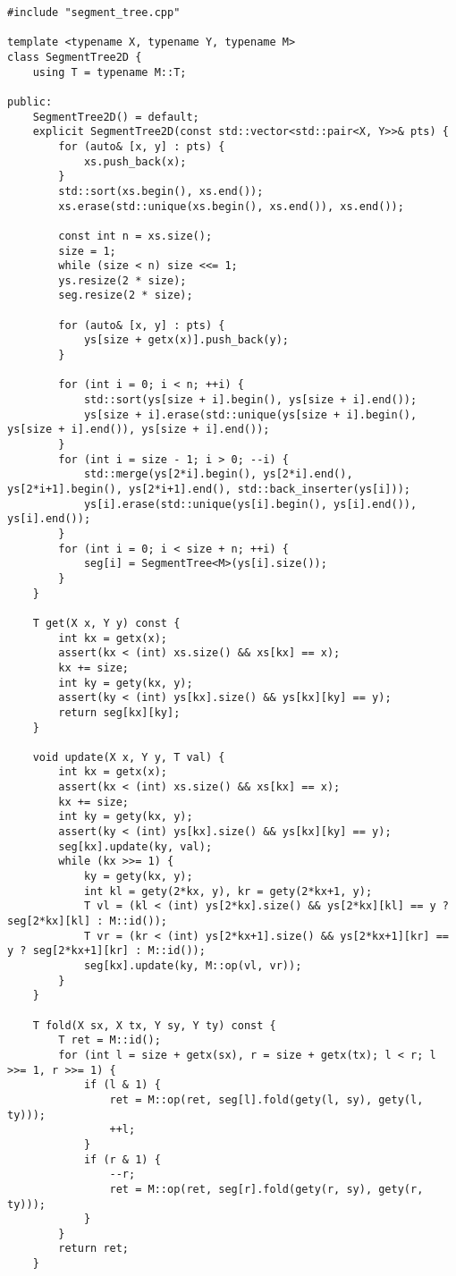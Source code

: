\begin{lstlisting}
#include "segment_tree.cpp"

template <typename X, typename Y, typename M>
class SegmentTree2D {
    using T = typename M::T;

public:
    SegmentTree2D() = default;
    explicit SegmentTree2D(const std::vector<std::pair<X, Y>>& pts) {
        for (auto& [x, y] : pts) {
            xs.push_back(x);
        }
        std::sort(xs.begin(), xs.end());
        xs.erase(std::unique(xs.begin(), xs.end()), xs.end());

        const int n = xs.size();
        size = 1;
        while (size < n) size <<= 1;
        ys.resize(2 * size);
        seg.resize(2 * size);

        for (auto& [x, y] : pts) {
            ys[size + getx(x)].push_back(y);
        }

        for (int i = 0; i < n; ++i) {
            std::sort(ys[size + i].begin(), ys[size + i].end());
            ys[size + i].erase(std::unique(ys[size + i].begin(), ys[size + i].end()), ys[size + i].end());
        }
        for (int i = size - 1; i > 0; --i) {
            std::merge(ys[2*i].begin(), ys[2*i].end(), ys[2*i+1].begin(), ys[2*i+1].end(), std::back_inserter(ys[i]));
            ys[i].erase(std::unique(ys[i].begin(), ys[i].end()), ys[i].end());
        }
        for (int i = 0; i < size + n; ++i) {
            seg[i] = SegmentTree<M>(ys[i].size());
        }
    }

    T get(X x, Y y) const {
        int kx = getx(x);
        assert(kx < (int) xs.size() && xs[kx] == x);
        kx += size;
        int ky = gety(kx, y);
        assert(ky < (int) ys[kx].size() && ys[kx][ky] == y);
        return seg[kx][ky];
    }

    void update(X x, Y y, T val) {
        int kx = getx(x);
        assert(kx < (int) xs.size() && xs[kx] == x);
        kx += size;
        int ky = gety(kx, y);
        assert(ky < (int) ys[kx].size() && ys[kx][ky] == y);
        seg[kx].update(ky, val);
        while (kx >>= 1) {
            ky = gety(kx, y);
            int kl = gety(2*kx, y), kr = gety(2*kx+1, y);
            T vl = (kl < (int) ys[2*kx].size() && ys[2*kx][kl] == y ? seg[2*kx][kl] : M::id());
            T vr = (kr < (int) ys[2*kx+1].size() && ys[2*kx+1][kr] == y ? seg[2*kx+1][kr] : M::id());
            seg[kx].update(ky, M::op(vl, vr));
        }
    }

    T fold(X sx, X tx, Y sy, Y ty) const {
        T ret = M::id();
        for (int l = size + getx(sx), r = size + getx(tx); l < r; l >>= 1, r >>= 1) {
            if (l & 1) {
                ret = M::op(ret, seg[l].fold(gety(l, sy), gety(l, ty)));
                ++l;
            }
            if (r & 1) {
                --r;
                ret = M::op(ret, seg[r].fold(gety(r, sy), gety(r, ty)));
            }
        }
        return ret;
    }


\end{lstlisting}
